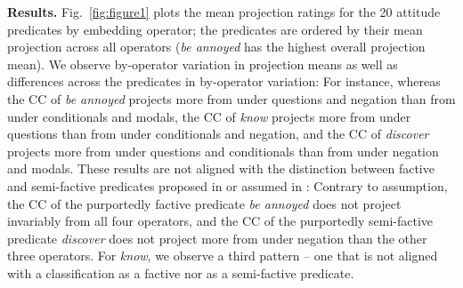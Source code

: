 \documentclass[12pt, a4paper]{article}
\begin{document}




\noindent
{\bf Results.} Fig.~\ref{fig:figure1} plots the mean projection ratings for the 20 attitude predicates by embedding operator; the predicates are ordered by their mean projection across all operators (\emph{be annoyed} has the highest overall projection mean). We observe by-operator variation in projection means as well as differences across the predicates in by-operator variation: For instance, whereas the CC of \emph{be annoyed} projects more from under questions and negation than from under conditionals and modals, the CC of \emph{know} projects more from under questions than from under conditionals and negation, and the CC of \emph{discover} projects more from under questions and conditionals than from under negation and modals. These results are not aligned with the distinction between factive and semi-factive predicates proposed in \citealt{karttunen_observations_1971} or assumed in \citealt{djarv_cognitive_2018}: Contrary to assumption, the CC of the purportedly factive predicate \emph{be annoyed} does not project invariably from all four operators, and the CC of the purportedly semi-factive predicate \emph{discover} does not project more from under negation than the other three operators. For {\em know}, we observe a third pattern -- one that is not aligned with a classification as a factive nor as a semi-factive predicate. 
\end{document}
